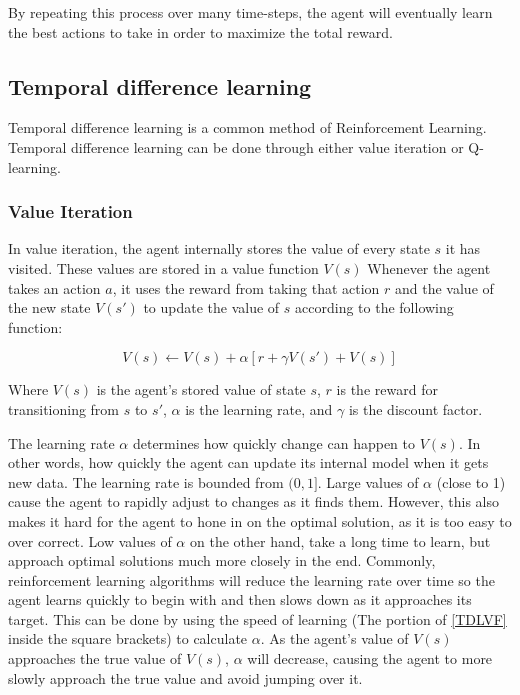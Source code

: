 \documentclass[12pt]{thesis}
\begin{document}
By repeating this process over many time-steps, the agent will eventually learn the best actions to take in order to maximize the total reward.

\subsection{Temporal difference learning}
Temporal difference learning is a common method of Reinforcement Learning. Temporal difference learning can be done through either value iteration or Q-learning.
\subsubsection{Value Iteration}
In value iteration, the agent internally stores the value of every state $s$ it has visited. These values are stored in a value function $V(s)$ Whenever the agent takes an action $a$, it uses the reward from taking that action $r$ and the value of the new state $V(s')$ to update the value of $s$ according to the following function:

\begin{equation}
V(s) \leftarrow V(s) + \alpha [r + \gamma V(s') + V(s)]
\label{TDLVF}
\end{equation}

Where $V(s)$ is the agent's stored value of state $s$, $r$ is the reward for transitioning from $s$ to $s'$, $\alpha$ is the learning rate, and $\gamma$ is the discount factor.

The learning rate $\alpha$ determines how quickly change can happen to $V(s)$. In other words, how quickly the agent can update its internal model when it gets new data. The learning rate is bounded from $(0,1]$. Large values of $\alpha$ (close to 1) cause the agent to rapidly adjust to changes as it finds them. However, this also makes it hard for the agent to hone in on the optimal solution, as it is too easy to over correct. Low values of $\alpha$ on the other hand, take a long time to learn, but approach optimal solutions much more closely in the end. Commonly, reinforcement learning algorithms will reduce the learning rate over time so the agent learns quickly to begin with and then slows down as it approaches its target. This can be done by using the speed of learning (The portion of \ref{TDLVF} inside the square brackets) to calculate $\alpha$. As the agent's value of $V(s)$ approaches the true value of $V(s)$, $\alpha$ will decrease, causing the agent to more slowly approach the true value and avoid jumping over it.
\end{document}
